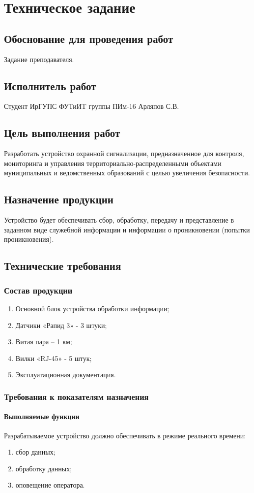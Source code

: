 \chapter{Техническое задание}
	\section{Обоснование для проведения работ}
		Задание преподавателя.
	\section{Исполнитель работ}
		Студент ИрГУПС ФУТиИT группы ПИм-16 Арляпов С.В.
	\section{Цель выполнения работ}
		Разработать устройство охранной сигнализации, предназначенное для контроля, мониторинга и управления территориально-распределенными объектами муниципальных и ведомственных образований с целью увеличения безопасности.
	\section{Назначение продукции}
		Устройство будет обеспечивать сбор, обработку, передачу и представление в заданном виде служебной информации и информации о проникновении (попытки проникновения).
	\section{Технические требования}
		\subsection{Состав продукции}
		 	\begin{enumerate}
\changefontsizes[14pt]{14pt}
				\item Основной блок устройства обработки информации;
				\item Датчики «Рапид 3» - 3 штуки;
				\item Витая пара – 1 км;
				\item Вилки «RJ-45» - 5 штук;
				\item Эксплуатационная документация.
			\end{enumerate}
		\subsection{Требования к показателям назначения}
			\subsubsection{Выполняемые функции}
				Разрабатываемое устройство должно обеспечивать в режиме реального времени:
				\begin{enumerate}
\changefontsizes[14pt]{14pt}
					\item сбор данных;
					\item обработку данных;
					\item оповещение оператора.
				\end{enumerate}
